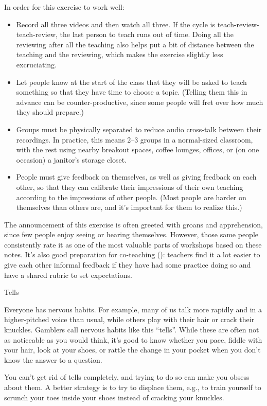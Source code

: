 In order for this exercise to work well:

\begin{itemize}

  \item
    Record all three videos and then watch all three.  If the cycle is
    teach-review-teach-review, the last person to teach runs out of
    time. Doing all the reviewing after all the teaching also helps
    put a bit of distance between the teaching and the reviewing,
    which makes the exercise slightly less excruciating.

  \item
    Let people know at the start of the class that they will be asked
    to teach something so that they have time to choose a topic.
    (Telling them this in advance can be counter-productive, since
    some people will fret over how much they should prepare.)

  \item
    Groups must be physically separated to reduce audio cross-talk
    between their recordings. In practice, this means 2--3 groups in a
    normal-sized classroom, with the rest using nearby breakout
    spaces, coffee lounges, offices, or (on one occasion) a janitor's
    storage closet.

  \item
    People must give feedback on themselves, as well as giving
    feedback on each other, so that they can calibrate their
    impressions of their own teaching according to the impressions of
    other people. (Most people are harder on themselves than others
    are, and it's important for them to realize this.)

\end{itemize}

The announcement of this exercise is often greeted with groans and
apprehension, since few people enjoy seeing or hearing themselves.
However, those same people consistently rate it as one of the most
valuable parts of workshops based on these notes.  It's also good
preparation for co-teaching (): teachers
find it a lot easier to give each other informal feedback if they have
had some practice doing so and have a shared rubric to set
expectations.

\begin{callout}{Tells}

  Everyone has nervous habits. For example, many of us talk more
  rapidly and in a higher-pitched voice than usual, while others play
  with their hair or crack their knuckles.  Gamblers call nervous
  habits like this ``tells''. While these are often not as noticeable
  as you would think, it's good to know whether you pace, fiddle with
  your hair, look at your shoes, or rattle the change in your pocket
  when you don't know the answer to a question.

  You can't get rid of tells completely, and trying to do so can make
  you obsess about them. A better strategy is to try to displace them,
  e.g., to train yourself to scrunch your toes inside your shoes
  instead of cracking your knuckles.

\end{callout}

